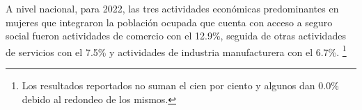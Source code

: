 A nivel nacional, para 2022, las tres actividades económicas predominantes en mujeres que integraron la población ocupada que cuenta con acceso a seguro social fueron actividades de comercio con el 12.9\%, seguida de otras actividades de servicios con el 7.5\% y actividades de industria manufacturera con el 6.7\%. \footnote{Los resultados reportados no suman el cien por ciento y algunos dan 0.0\% debido al redondeo de los mismos.}